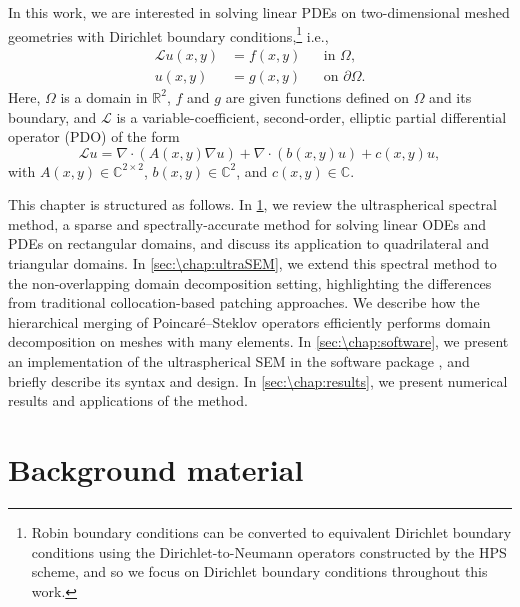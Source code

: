 In this work, we are interested in solving linear PDEs on two-dimensional meshed geometries with Dirichlet boundary conditions,\footnote{Robin boundary conditions can be converted to equivalent Dirichlet boundary conditions using the Dirichlet-to-Neumann operators constructed by the HPS scheme, and so we focus on Dirichlet boundary conditions throughout this work.
} i.e., 
\begin{equation}\label{eq:\chap:pde}
\begin{aligned}
\mathcal{L}u(x,y) &= f(x,y) &&\text{in } \Omega, \\
u(x,y) &= g(x,y) &&\text{on } \partial\Omega.
\end{aligned}
\end{equation}
Here, $\Omega$ is a domain in $\mathbb{R}^2$, $f$ and $g$ are given functions defined on $\Omega$ and its boundary, and $\mathcal{L}$ is a variable-coefficient, second-order, elliptic partial differential operator (PDO) of the form
\begin{equation}\label{eq:\chap:pdo}
\mathcal{L}u = \nabla \cdot \left(A(x,y) \nabla u\right) + \nabla \cdot \left(b(x,y) u\right) + c(x,y) u,
\end{equation}
with $A(x,y) \in \mathbb{C}^{2 \times 2}$, $b(x,y) \in \mathbb{C}^2$, and $c(x,y) \in \mathbb{C}$.

This chapter is structured as follows. In \cref{sec:\chap:background}, we review the ultraspherical spectral method, a sparse and spectrally-accurate method for solving linear ODEs and PDEs on rectangular domains, and discuss its application to quadrilateral and triangular domains. In \cref{sec:\chap:ultraSEM}, we extend this spectral method to the non-overlapping domain decomposition setting, highlighting the differences from traditional collocation-based patching approaches. We describe how the hierarchical merging of Poincar\'{e}--Steklov operators efficiently performs domain decomposition on meshes with many elements. In \cref{sec:\chap:software}, we present an implementation of the ultraspherical SEM in the software package \ultraSEM, and briefly describe its syntax and design. In \cref{sec:\chap:results}, we present numerical results and applications of the method.

\section{Background material}\label{sec:\chap:background}

